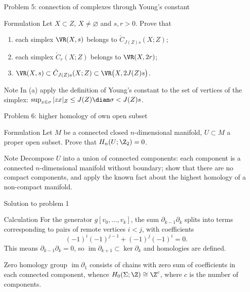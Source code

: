 \documentclass[aspectratio=169,11pt]{beamer}
\begin{document}
\begin{frame}{Problem \textup{5}: connection of complexes through Young's constant}
\begin{block}{Formulation}
Let $X \subset Z$, $X \ne \varnothing$ and $s, r > 0$. Prove that
\begin{enumerate}
\item[(a)] each simplex $\VR(X,s)$ belongs to $\check C_{J(Z)s}(X;Z)$\textup{;}
\item[(b)] each simplex $\check C_r(X;Z)$ belongs to $\VR(X,2r)$\textup{;}
\item[(c)] $\VR(X,s) \subset \check C_{J(Z)s}(X;Z) \subset \VR\bigl(X, 2J(Z)s\bigr)$.
\end{enumerate}
\end{block}
\begin{block}{Note}
In \textup{(a)} apply the definition of Young's constant to the set of vertices of the simplex\textup{:} $\sup_{x\in\sigma}|zx|_Z \le J(Z)\diam\sigma < J(Z)s$.
\end{block}
\end{frame}

\begin{frame}{Problem \textup{6}: higher homology of own open subset}
\begin{block}{Formulation}
Let $M$ be a connected closed $n$-dimensional manifold, $U \subset M$ a proper open subset. Prove that $H_n(U;\Z_2) = 0$.
\end{block}
\begin{block}{Note}
Decompose $U$ into a union of connected components\textup{:} each component is a connected $n$-dimensional manifold without boundary\textup{;} show that there are no compact components, and apply the known fact about the highest homology of a non-compact manifold.
\end{block}
\end{frame}

\begin{frame}{Solution to problem \textup{1}}
\begin{block}{Calculation}
For the generator $g[v_0,\dots,v_k]$, the sum $\partial_{k-1}\partial_k$ splits into terms corresponding to pairs of remote vertices $i<j$, with coefficients
\[
(-1)^i(-1)^{j-1} + (-1)^j(-1)^i = 0 .
\]
This means $\partial_{k-1}\partial_k = 0$, so $\operatorname{im}\partial_{k+1} \subset \ker\partial_k$ and homologies are defined.
\end{block}
\begin{block}{Zero homology group}
$\operatorname{im}\partial_1$ consists of chains with zero sum of coefficients in each connected component, whence $H_0(\Sigma;\Z) \cong \Z^{c}$, where $c$ is the number of components.
\end{block}
\end{frame}
\end{document}
